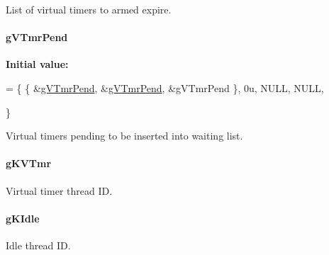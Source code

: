 List of virtual timers to armed expire. 

\hypertarget{group__kern__impl_gac3aa245b43e7f69c7e184756bc56af2c}{
\paragraph[{g\-V\-Tmr\-Pend}]{ g\-V\-Tmr\-Pend\hspace{0.3cm}{\ttfamily [static]}}}\label{group__kern__impl_gac3aa245b43e7f69c7e184756bc56af2c}
{\bfseries Initial value\-:}
\begin{DoxyCode}
= \{
   \{    &\hyperlink{group__kern__impl_gac3aa245b43e7f69c7e184756bc56af2c}{gVTmrPend},
        &\hyperlink{group__kern__impl_gac3aa245b43e7f69c7e184756bc56af2c}{gVTmrPend},
        &gVTmrPend
   \},
   0u,
   NULL,
   NULL,



\}
\end{DoxyCode}


Virtual timers pending to be inserted into waiting list. 

\hypertarget{group__kern__impl_ga7725555010cb1e7f32842aa5755a6945}{
\paragraph[{g\-K\-V\-Tmr}]{ g\-K\-V\-Tmr\hspace{0.3cm}{\ttfamily [static]}}}\label{group__kern__impl_ga7725555010cb1e7f32842aa5755a6945}


Virtual timer thread I\-D. 

\hypertarget{group__kern__impl_gad32c3bee0b16ff9c156476f04200fc0a}{
\paragraph[{g\-K\-Idle}]{ g\-K\-Idle\hspace{0.3cm}{\ttfamily [static]}}}\label{group__kern__impl_gad32c3bee0b16ff9c156476f04200fc0a}


Idle thread I\-D. 

